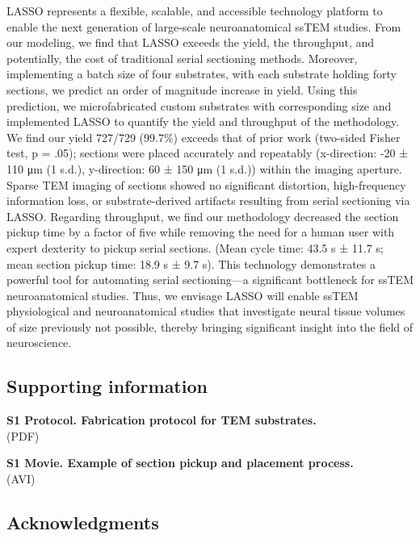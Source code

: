 \documentclass{article}
\begin{document}
LASSO represents a flexible, scalable, and accessible technology platform to enable the next generation of large-scale neuroanatomical ssTEM studies. From our modeling, we find that LASSO exceeds the yield, the throughput, and potentially, the cost of traditional serial sectioning methods. Moreover, implementing a batch size of four substrates, with each substrate holding forty sections, we predict an order of magnitude increase in yield. Using this prediction, we microfabricated custom substrates with corresponding size and implemented LASSO to quantify the yield and throughput of the methodology. We find our yield 727/729 (99.7\%) exceeds that of prior work (two-sided Fisher test, p = .05); sections were placed accurately and repeatably (x-direction: -20 ± 110 μm (1 s.d.), y-direction: 60 ± 150 μm (1 s.d.)) within the imaging aperture. Sparse TEM imaging of sections showed no significant distortion, high-frequency information loss, or substrate-derived artifacts resulting from serial sectioning via LASSO. Regarding throughput, we find our methodology decreased the section pickup time by a factor of five while removing the need for a human user with expert dexterity to pickup serial sections. (Mean cycle time: 43.5 s ± 11.7 s; mean section pickup time: 18.9 s ± 9.7 s). This technology demonstrates a powerful tool for automating serial sectioning—a significant bottleneck for ssTEM neuroanatomical studies. Thus, we envisage LASSO will enable ssTEM physiological and neuroanatomical studies that investigate neural tissue volumes of size previously not possible, thereby bringing significant insight into the field of neuroscience.

\subsection*{Supporting information}

\noindent\textbf{S1 Protocol. Fabrication protocol for TEM substrates.}\\
(PDF)

\noindent\textbf{S1 Movie. Example of section pickup and placement process.}\\
(AVI)

\subsection*{Acknowledgments}
\end{document}
